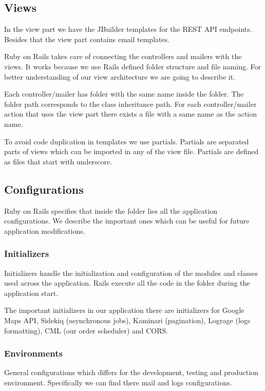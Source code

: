 	\subsection{Views}
		In the view part we have the JBuilder templates for the REST API endpoints. Besides that the view part contains email templates.
		
		Ruby on Rails takes care of connecting the controllers and mailers with the views. It works because we use Rails defined folder structure and file naming. For better understanding of our view architecture we are going to describe it.
		
		Each controller/mailer has folder with the same name inside the  folder. The folder path corresponds to the class inheritance path. For each controller/mailer action that uses the view part there exists a file with a same name as the action name.
		
		To avoid code duplication in templates we use partials. Partials are separated parts of views which can be imported in any of the view file. Partials are defined as files that start with underscore. 

		

		
		
	\subsection{Configurations}
		Ruby on Rails specifies that inside the   folder lies all the application configurations. We describe the important ones which can be useful for future application modifications.
		\subsubsection{Initializers}
			Initializers handle the initialization and configuration of the modules and classes used across the application. Rails execute all the code in the  folder during the application start.
			
			The important initializers in our application there are initializers for Google Maps API, Sidekiq (asynchronous jobs), Kaminari (pagination), Lograge (logs formatting), CML (our order scheduler) and CORS.
			
		\subsubsection{Environments}
			General configurations which differs for the development, testing and production environment. Specifically we can find there mail and logs configurations. 
